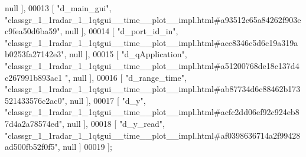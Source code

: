 \begin{DoxyCode}
      null ],
00013     [ \textcolor{stringliteral}{"d\_main\_gui"}, \textcolor{stringliteral}{"classgr\_1\_1radar\_1\_1qtgui\_\_time\_\_plot\_\_impl.html#a93512c65a84262f903ec9fea50d6ba59"}, 
      null ],
00014     [ \textcolor{stringliteral}{"d\_port\_id\_in"}, \textcolor{stringliteral}{"classgr\_1\_1radar\_1\_1qtgui\_\_time\_\_plot\_\_impl.html#acc8346c5d6c19a319ab0253fa27142e3"},
       null ],
00015     [ \textcolor{stringliteral}{"d\_qApplication"}, \textcolor{stringliteral}{"classgr\_1\_1radar\_1\_1qtgui\_\_time\_\_plot\_\_impl.html#a51200768de18c137d4c267991b893ac1
      "}, null ],
00016     [ \textcolor{stringliteral}{"d\_range\_time"}, \textcolor{stringliteral}{"classgr\_1\_1radar\_1\_1qtgui\_\_time\_\_plot\_\_impl.html#ab87734d6c88462b173521433576c2ac0"},
       null ],
00017     [ \textcolor{stringliteral}{"d\_y"}, \textcolor{stringliteral}{"classgr\_1\_1radar\_1\_1qtgui\_\_time\_\_plot\_\_impl.html#acfc2dd06ef92c924eb87d4a2a78574ed"}, null ],
00018     [ \textcolor{stringliteral}{"d\_y\_read"}, \textcolor{stringliteral}{"classgr\_1\_1radar\_1\_1qtgui\_\_time\_\_plot\_\_impl.html#af0398636714a2f99428ad500fb52f0f5"}, 
      null ]
00019 ];
\end{DoxyCode}
